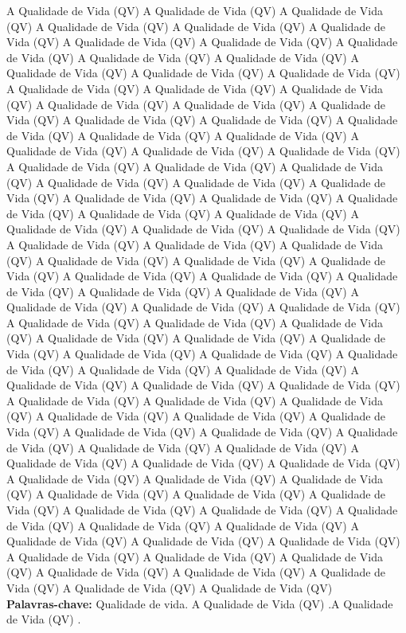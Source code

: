 \begin{resumo}

{\noindent A Qualidade de Vida (QV) A Qualidade de Vida (QV) A Qualidade de Vida (QV) A Qualidade de Vida (QV) A Qualidade de Vida (QV) A Qualidade de Vida (QV) A Qualidade de Vida (QV) A Qualidade de Vida (QV) A Qualidade de Vida (QV) A Qualidade de Vida (QV) A Qualidade de Vida (QV) A Qualidade de Vida (QV) A Qualidade de Vida (QV) A Qualidade de Vida (QV) A Qualidade de Vida (QV) A Qualidade de Vida (QV) A Qualidade de Vida (QV) A Qualidade de Vida (QV) A Qualidade de Vida (QV) A Qualidade de Vida (QV) A Qualidade de Vida (QV) A Qualidade de Vida (QV) A Qualidade de Vida (QV) A Qualidade de Vida (QV) A Qualidade de Vida (QV) A Qualidade de Vida (QV) A Qualidade de Vida (QV) A Qualidade de Vida (QV) A Qualidade de Vida (QV) A Qualidade de Vida (QV) A Qualidade de Vida (QV) A Qualidade de Vida (QV) A Qualidade de Vida (QV) A Qualidade de Vida (QV) A Qualidade de Vida (QV) A Qualidade de Vida (QV) A Qualidade de Vida (QV) A Qualidade de Vida (QV) A Qualidade de Vida (QV) A Qualidade de Vida (QV) A Qualidade de Vida (QV) A Qualidade de Vida (QV) A Qualidade de Vida (QV) A Qualidade de Vida (QV) A Qualidade de Vida (QV) A Qualidade de Vida (QV) A Qualidade de Vida (QV) A Qualidade de Vida (QV) A Qualidade de Vida (QV) A Qualidade de Vida (QV) A Qualidade de Vida (QV) A Qualidade de Vida (QV) A Qualidade de Vida (QV) A Qualidade de Vida (QV) A Qualidade de Vida (QV) A Qualidade de Vida (QV) A Qualidade de Vida (QV) A Qualidade de Vida (QV) A Qualidade de Vida (QV) A Qualidade de Vida (QV) A Qualidade de Vida (QV) A Qualidade de Vida (QV) A Qualidade de Vida (QV) A Qualidade de Vida (QV) A Qualidade de Vida (QV) A Qualidade de Vida (QV) A Qualidade de Vida (QV) A Qualidade de Vida (QV) A Qualidade de Vida (QV) A Qualidade de Vida (QV) A Qualidade de Vida (QV) A Qualidade de Vida (QV) A Qualidade de Vida (QV) A Qualidade de Vida (QV) A Qualidade de Vida (QV) A Qualidade de Vida (QV) A Qualidade de Vida (QV) A Qualidade de Vida (QV) A Qualidade de Vida (QV) A Qualidade de Vida (QV) A Qualidade de Vida (QV) A Qualidade de Vida (QV) A Qualidade de Vida (QV) A Qualidade de Vida (QV) A Qualidade de Vida (QV) A Qualidade de Vida (QV) A Qualidade de Vida (QV) A Qualidade de Vida (QV) A Qualidade de Vida (QV) A Qualidade de Vida (QV) A Qualidade de Vida (QV) A Qualidade de Vida (QV) A Qualidade de Vida (QV) A Qualidade de Vida (QV) A Qualidade de Vida (QV) A Qualidade de Vida (QV) A Qualidade de Vida (QV) A Qualidade de Vida (QV) A Qualidade de Vida (QV) A Qualidade de Vida (QV) A Qualidade de Vida (QV) A Qualidade de Vida (QV) A Qualidade de Vida (QV) A Qualidade de Vida (QV) A Qualidade de Vida (QV) A Qualidade de Vida (QV) \\

}
{\noindent \textbf{Palavras-chave:}  Qualidade de vida. A Qualidade de Vida (QV) .A Qualidade de Vida (QV) .}

\end{resumo}